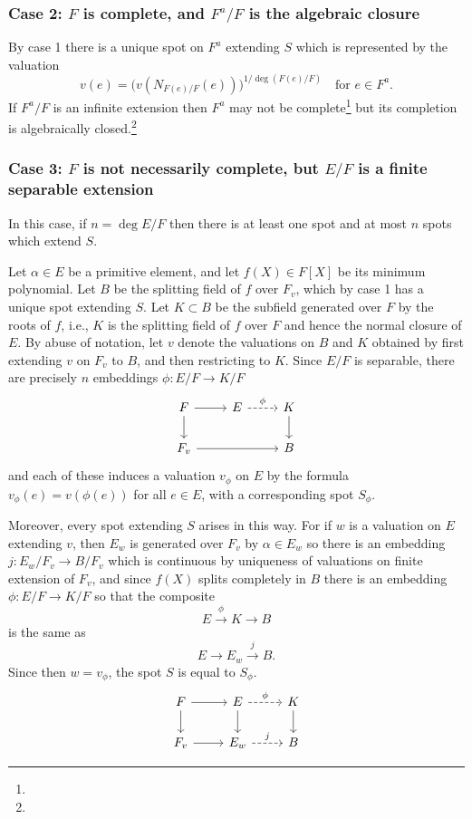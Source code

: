 \documentclass[10pt,leqno]{article}
\theoremstyle{definition}
\def\fnfotw{}
\def\fnfoth{}
\begin{document}
\subsubsection[Case 2]{Case 2: $F$ is complete, and $F^a/F$ is the algebraic closure}
\label{4.2.2}

By case 1 there is a unique spot on $F^a$ extending $S$ which is represented by the valuation
\[
v(e) = \bigl(
v(N_{F(e)/F}(e))
\bigr)^{1/\deg(F(e)/F)}
\quad
\text{for $e \in F^a$.}
\]
If $F^a/F$ is an infinite extension then $F^a$ may not be complete\footnote{\fnfotw} but its completion is algebraically closed.\footnote{\fnfoth}


\subsubsection[Case 3]{Case 3: $F$ is not necessarily complete, but $E/F$ is a finite separable extension}
\label{4.2.3}

In this case, if $n = \deg E/F$ then there is at least one spot and at most $n$ spots which extend $S$.

Let $\alpha \in E$ be a primitive element, and let $f(X) \in F[X]$ be its minimum polynomial.
Let $B$ be the splitting field of $f$ over $F_v$, which by case 1 has a unique spot extending $S$.
Let $K \subset B$ be the subfield generated over $F$ by the roots of $f$, i.e., $K$ is the splitting field of $f$ over $F$ and hence the normal closure of $E$.
By abuse of notation, let $v$ denote the valuations on $B$ and $K$ obtained by first extending $v$ on $F_v$ to $B$, and then restricting to $K$.
Since $E/F$ is separable, there are precisely $n$ embeddings $\phi : E/F \to K/F$ 
\[
\begin{tikzcd}
F \ar[d] \ar[r] & E \ar[r, dashed, "\phi"] & K \ar[d]
\\
F_v \ar[rr] & & B
\end{tikzcd}
\]
and each of these induces a valuation $v_\phi$ on $E$ by the formula $v_\phi(e) = v(\phi(e))$ for all $e \in E$, with a corresponding spot $S_\phi$.

Moreover, every spot extending $S$ arises in this way.
For if $w$ is a valuation on $E$ extending $v$, then $E_w$ is generated over $F_v$ by $\alpha \in E_w$ so there is an embedding $j : E_w/F_v \to B/F_v$ which is continuous by uniqueness of valuations on finite extension of $F_v$, and since $f(X)$ splits completely in $B$ there is an embedding $\phi : E/F \to K/F$ so that the composite 
\[
E \stackrel{\phi}{\longrightarrow} K \longrightarrow B
\]
is the same as 
\[
E \longrightarrow E_w \stackrel{j}{\longrightarrow} B.
\]
Since then $w = v_\phi$, the spot $S$ is equal to $S_\phi$.
\[
\begin{tikzcd}
F \ar[d] \ar[r] & E \ar[r, dashed, "\phi"] \ar[d] & K \ar[d]
\\
F_v \ar[r] & E_w \ar[r, dashed, "j"] & B
\end{tikzcd}
\]
\end{document}
